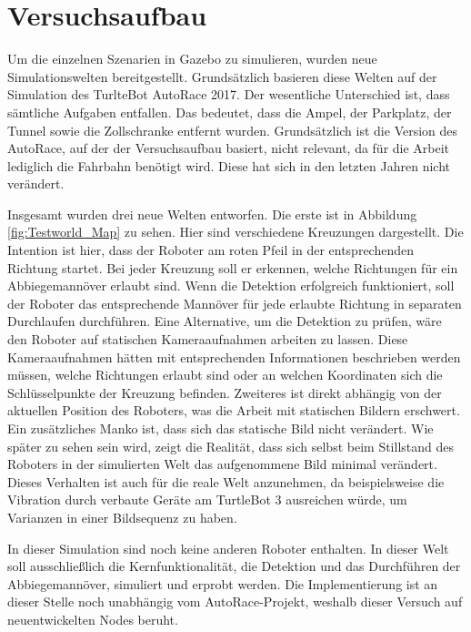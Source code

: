 \section{Versuchsaufbau}
Um die einzelnen Szenarien in Gazebo zu simulieren, wurden neue Simulationswelten bereitgestellt. Grundsätzlich basieren diese Welten auf der Simulation des TurlteBot AutoRace 2017.
Der wesentliche Unterschied ist, dass sämtliche Aufgaben entfallen. Das bedeutet, dass die Ampel, der Parkplatz, der Tunnel sowie die Zollschranke entfernt wurden. Grundsätzlich
ist die Version des AutoRace, auf der der Versuchsaufbau basiert, nicht relevant, da für die Arbeit lediglich die Fahrbahn benötigt wird. Diese hat sich in den letzten Jahren nicht
verändert.

Insgesamt wurden drei neue Welten entworfen. Die erste ist in Abbildung \ref{fig:Testworld_Map} zu sehen. Hier sind verschiedene Kreuzungen dargestellt. Die Intention ist hier,
dass der Roboter am roten Pfeil in der entsprechenden Richtung startet. Bei jeder Kreuzung soll er erkennen, welche Richtungen für ein Abbiegemannöver erlaubt sind. Wenn die Detektion
erfolgreich funktioniert, soll der Roboter das entsprechende Mannöver für jede erlaubte Richtung in separaten Durchlaufen durchführen. Eine Alternative, um die Detektion zu prüfen, wäre
den Roboter auf statischen Kameraaufnahmen arbeiten zu lassen. Diese Kameraaufnahmen hätten mit entsprechenden Informationen beschrieben werden müssen, welche Richtungen erlaubt sind oder
an welchen Koordinaten sich die Schlüsselpunkte der Kreuzung befinden. Zweiteres ist direkt abhängig von der aktuellen Position des Roboters, was die Arbeit mit statischen Bildern
erschwert. Ein zusätzliches Manko ist, dass sich das statische Bild nicht verändert. Wie später zu sehen sein wird, zeigt die Realität, dass sich selbst beim Stillstand des Roboters in der
simulierten Welt das aufgenommene Bild minimal verändert. Dieses Verhalten ist auch für die reale Welt anzunehmen, da beispielsweise die Vibration durch verbaute Geräte am TurtleBot 3
ausreichen würde, um Varianzen in einer Bildsequenz zu haben.

In dieser Simulation sind noch keine anderen Roboter enthalten. In dieser Welt soll ausschließlich die Kernfunktionalität, die Detektion und das Durchführen der Abbiegemannöver, 
simuliert und erprobt werden. Die Implementierung ist an dieser Stelle noch unabhängig vom AutoRace-Projekt, weshalb dieser Versuch auf neuentwickelten Nodes beruht. 

